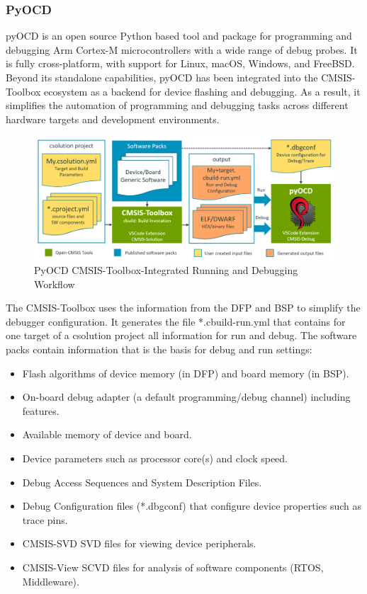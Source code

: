 \subsubsection{PyOCD}
pyOCD is an open source Python based tool and package for programming and debugging Arm Cortex-M microcontrollers with a wide range of debug probes. It is fully cross-platform, with support for Linux, macOS, Windows, and FreeBSD.
Beyond its standalone capabilities, pyOCD has been integrated into the CMSIS-Toolbox ecosystem as a backend for device flashing and debugging. As a result, it simplifies the automation of programming and debugging tasks across different hardware targets and development environments.
\begin{figure}[H]
	\centering
	\includegraphics[width=15cm]{img/ST_Summer_Internship/cbuild-run.png}
	\caption{PyOCD CMSIS-Toolbox-Integrated Running and Debugging Workflow}
	\label{fig:debug_wf}
\end{figure}
The CMSIS-Toolbox uses the information from the DFP and BSP to simplify the debugger configuration. It generates the file *.cbuild-run.yml that contains for one target of a csolution project all information for run and debug.
The software packs contain information that is the basis for debug and run settings:
\begin{itemize}
	\item Flash algorithms of device memory (in DFP) and board memory (in BSP).
	\item On-board debug adapter (a default programming/debug channel) including features.
	\item Available memory of device and board.
	\item Device parameters such as processor core(s) and clock speed.
	\item Debug Access Sequences and System Description Files.
	\item Debug Configuration files (*.dbgconf) that configure device properties such as trace pins.
	\item CMSIS-SVD SVD files for viewing device peripherals.
	\item CMSIS-View SCVD files for analysis of software components (RTOS, Middleware).
\end{itemize}
